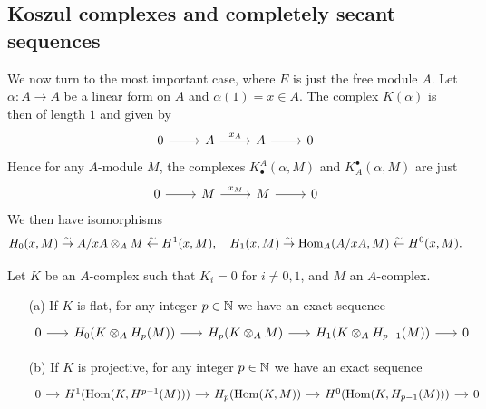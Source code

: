 \subsection{Koszul complexes and completely secant sequences}
We now turn to the most important case, where $E$ is just the free module $A$. Let $\alpha:A\to A$ be a linear form on $A$ and $\alpha(1)=x\in A$. The complex $K(\alpha)$ is then of length $1$ and given by
\[\begin{tikzcd}
0\ar[r]&A\ar[r,"x_A"]&A\ar[r]&0
\end{tikzcd}\]
Hence for any $A$-module $M$, the complexes $K_\bullet^A(\alpha,M)$ and $K^\bullet_A(\alpha,M)$ are just
\[\begin{tikzcd}
0\ar[r]&M\ar[r,"x_M"]&M\ar[r]&0
\end{tikzcd}\]
We then have isomorphisms
\[H_0(x,M)\stackrel{\sim}{\to} A/xA\otimes_AM\stackrel{\sim}{\leftarrow} H^1(x,M),\quad H_1(x,M)\stackrel{\sim}{\to}\mathrm{Hom}_A(A/xA,M)\stackrel{\sim}{\leftarrow} H^0(x,M).\]
\begin{lemma}\label{module complex tensoring and Hom with homology lemma}
Let $K$ be an $A$-complex such that $K_i=0$ for $i\neq 0,1$, and $M$ an $A$-complex.
\begin{itemize}
\item[(a)] If $K$ is flat, for any integer $p\in\mathbb{N}$ we have an exact sequence
\[\begin{tikzcd}[column sep=6mm]
0\ar[r]&H_0(K\otimes_AH_p(M))\ar[r]&H_p(K\otimes_AM)\ar[r]&H_1(K\otimes_AH_{p-1}(M))\ar[r]&0
\end{tikzcd}\] 
\item[(b)] If $K$ is projective, for any integer $p\in\mathbb{N}$ we have an exact sequence
\[\begin{tikzcd}[column sep=4mm]
0\ar[r]&H^1(\Hom(K,H^{p-1}(M)))\ar[r]&H_p(\Hom(K,M))\ar[r]&H^0(\Hom(K,H_{p-1}(M)))\ar[r]&0
\end{tikzcd}\] 
\end{itemize}
\end{lemma}
